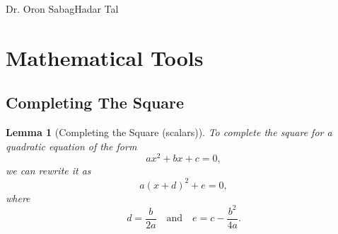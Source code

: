 \documentclass[a4 paper]{article}
\numberwithin{equation}{section}
\theoremstyle{boldStyle}
\theoremstyle{boldBlueStyle}
\newtheorem{lemma}{Lemma}[section]
\theoremstyle{boldPurpleStyle}
\theoremstyle{boldRedStyle}
\theoremstyle{boldGreenStyle}
\begin{document}
{Dr. Oron Sabag}{}{Hadar Tal}{}

\tableofcontents


\newpage
\section{Mathematical Tools}


\subsection{Completing The Square}

\begin{lemma}[Completing the Square (scalars)]
  To complete the square for a quadratic equation of the form
  \[
  ax^2 + bx + c = 0,
  \]
  we can rewrite it as
  \[
  a(x + d)^2 + e = 0,
  \]
  where
  \[
  d = \frac{b}{2a} \quad \text{and} \quad e = c - \frac{b^2}{4a}.
  \]
\end{lemma}
\end{document}
